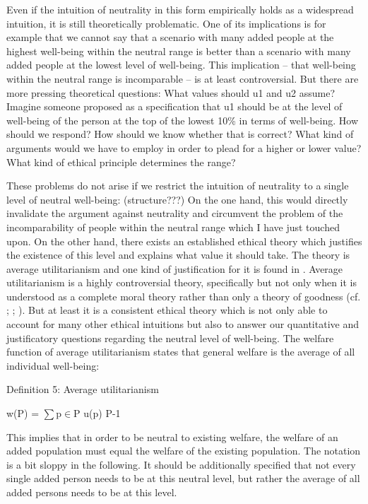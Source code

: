 Even if the intuition of neutrality in this form empirically holds as a widespread intuition, it is still theoretically problematic. One of its implications is for example that we cannot say that a scenario with many added people at the highest well-being within the neutral range is better than a scenario with many added people at the lowest level of well-being. This implication – that well-being within the neutral range is incomparable – is at least controversial. But there are more pressing theoretical questions: What values should u1 and u2 assume? Imagine someone proposed as a specification that u1 should be at the level of well-being of the person at the top of the lowest 10\% in terms of well-being. How should we respond? How should we know whether that is correct? What kind of arguments would we have to employ in order to plead for a higher or lower value? What kind of ethical principle determines the range? 

These problems do not arise if we restrict the intuition of neutrality to a single level of neutral well-being: (structure???) On the one hand, this would directly invalidate the argument against neutrality and circumvent the problem of the incomparability of people within the neutral range which I have just touched upon. On the other hand, there exists an established ethical theory which justifies the existence of this level and explains what value it should take. The theory is average utilitarianism and one kind of justification for it is found in \cite{harsanzi_1955}. Average utilitarianism is a highly controversial theory, specifically but not only when it is understood as a complete moral theory rather than only a theory of goodness (cf. ; ; ). But at least it is a consistent ethical theory which is not only able to account for many other ethical intuitions but also to answer our quantitative and justificatory questions regarding the neutral level of well-being. The welfare function of average utilitarianism states that general welfare is the average of all individual well-being: 

Definition 5: Average utilitarianism 

w(P) = ${\sum}$p${\in}$P u(p) {\textbullet} {\textbar}P{\textbar}{}-1 

This implies that in order to be neutral to existing welfare, the welfare of an added population must equal the welfare of the existing population. The notation is a bit sloppy in the following. It should be additionally specified that not every single added person needs to be at this neutral level, but rather the average of all added persons needs to be at this level.  

